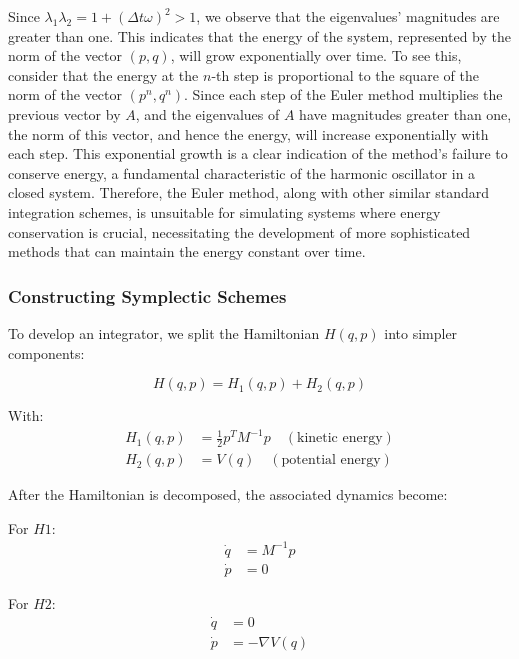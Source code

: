 \documentclass{article}
\begin{document}
Since \(\lambda_1 \lambda_2 = 1 + (\Delta t \omega)^2 > 1\), we observe that the eigenvalues' magnitudes are greater than one. This indicates that the energy of the system, represented by the norm of the vector \((p, q)\), will grow exponentially over time. To see this, consider that the energy at the \(n\)-th step is proportional to the square of the norm of the vector \((p^n, q^n)\). Since each step of the Euler method multiplies the previous vector by \(A\), and the eigenvalues of \(A\) have magnitudes greater than one, the norm of this vector, and hence the energy, will increase exponentially with each step. This exponential growth is a clear indication of the method's failure to conserve energy, a fundamental characteristic of the harmonic oscillator in a closed system. Therefore, the Euler method, along with other similar standard integration schemes, is unsuitable for simulating systems where energy conservation is crucial, necessitating the development of more sophisticated methods that can maintain the energy constant over time. 


\subsubsection{Constructing Symplectic Schemes}
\label{sec:constructing_symplectic_schemes}

To develop an integrator, we split the Hamiltonian \(H(q,p)\) into simpler components:

\begin{equation*}
	H(q,p) = H_1(q,p) + H_2(q,p)
\end{equation*}

With:
\begin{align*}
	H_1(q,p) & = \frac{1}{2} p^T M^{-1} p \quad (\text{kinetic energy}) \\
	H_2(q,p) & = V(q) \quad (\text{potential energy})
\end{align*}

After the Hamiltonian is decomposed, the associated dynamics become:

For \(H1\):
\begin{align*}
	\dot{q} &= M^{-1}p \\
	\dot{p} &= 0
\end{align*}

For \(H2\):
\begin{align*}
	\dot{q} &= 0 \\
	\dot{p} &= -\nabla V(q)
\end{align*}
\end{document}
